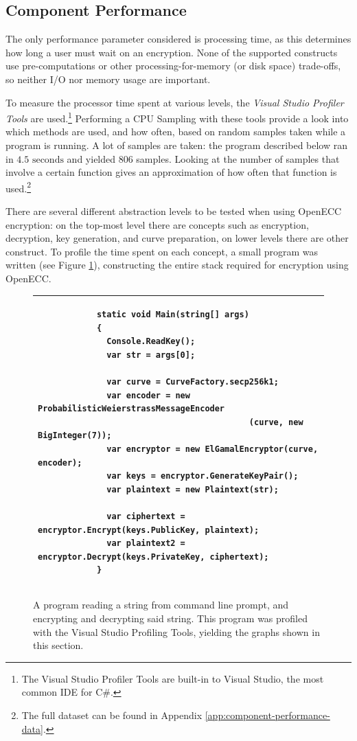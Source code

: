 \subsection{Component Performance}
\label{sec:performance_components}

The only performance parameter considered is processing time, as this determines how long a user must wait on an encryption.
None of the supported constructs use pre-computations or other processing-for-memory (or disk space) trade-offs, so neither
I/O nor memory usage are important.

To measure the processor time spent at various levels, the \emph{Visual Studio Profiler Tools} are used.\footnote{The Visual
Studio Profiler Tools are built-in to Visual Studio, the most common IDE for C\#.} Performing a CPU Sampling with these tools
provide a look into which methods are used, and how often, based on random samples taken while a program is running. A lot of
samples are taken: the program described below ran in \(4.5 \text{ seconds}\) and yielded 806 samples. Looking at the number of samples
that involve a certain function gives an approximation of how often that function is used.\footnote{The full dataset can be
found in Appendix \ref{app:component-performance-data}.}

There are several different abstraction levels to be tested when using OpenECC encryption: on the top-most level there are concepts
such as encryption, decryption, key generation, and curve preparation, on lower levels there are other construct. To profile the time
spent on each concept, a small program was written (see Figure \ref{fig:profiler-code}), constructing the entire stack required for
encryption using OpenECC.

\begin{figure}[htb]
	\centering
	\begin{tabular}{|p{\textwidth}|}
		\hline
		\begin{verbatim}
			static void Main(string[] args)
			{
			  Console.ReadKey();
			  var str = args[0];

			  var curve = CurveFactory.secp256k1;
			  var encoder = new ProbabilisticWeierstrassMessageEncoder
			                               (curve, new BigInteger(7));
			  var encryptor = new ElGamalEncryptor(curve, encoder);
			  var keys = encryptor.GenerateKeyPair();
			  var plaintext = new Plaintext(str);
			  
			  var ciphertext = encryptor.Encrypt(keys.PublicKey, plaintext);
			  var plaintext2 = encryptor.Decrypt(keys.PrivateKey, ciphertext);
			}
		\end{verbatim}
		\\
		\hline
	\end{tabular}
	\caption{A program reading a string from command line prompt, and encrypting and decrypting said string. This program
		was profiled with the Visual Studio Profiling Tools, yielding the graphs shown in this section.}
	\label{fig:profiler-code}
\end{figure}

